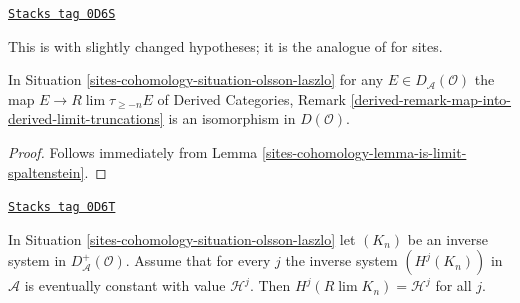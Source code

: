 \begin{lemma}
\label{sites-cohomology-lemma-olsson-laszlo}
\href{https://stacks.math.columbia.edu/tag/0D6S}{\texttt{Stacks tag 0D6S}}

\begin{reference}
This is \cite[Proposition 2.1.4]{six-I} with slightly changed
hypotheses; it is the analogue of \cite[Proposition 3.13]{Spaltenstein}
for sites.
\end{reference}
In Situation \ref{sites-cohomology-situation-olsson-laszlo} for any
$E \in D_\mathcal{A}(\mathcal{O})$ the map
$E \to R\lim \tau_{\geq -n} E$ of
Derived Categories, Remark
\ref{derived-remark-map-into-derived-limit-truncations}
is an isomorphism in $D(\mathcal{O})$.
\end{lemma}

\begin{proof}
Follows immediately from Lemma \ref{sites-cohomology-lemma-is-limit-spaltenstein}.
\end{proof}

\begin{lemma}
\label{sites-cohomology-lemma-olsson-laszlo-modified}
\href{https://stacks.math.columbia.edu/tag/0D6T}{\texttt{Stacks tag 0D6T}}

In Situation \ref{sites-cohomology-situation-olsson-laszlo} let
$(K_n)$ be an inverse system in $D_\mathcal{A}^+(\mathcal{O})$.
Assume that for every $j$ the inverse system $(H^j(K_n))$
in $\mathcal{A}$ is eventually constant with value $\mathcal{H}^j$. Then
$H^j(R\lim K_n) = \mathcal{H}^j$ for all $j$.
\end{lemma}

